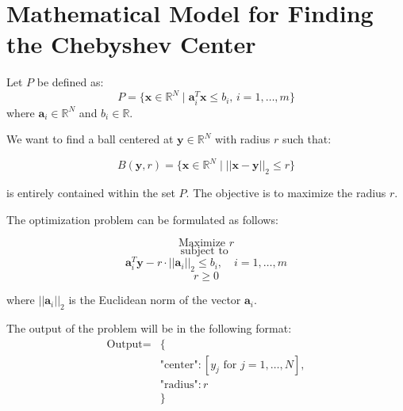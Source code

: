\documentclass{article}
\begin{document}
\section*{Mathematical Model for Finding the Chebyshev Center}

Let \( P \) be defined as:
\[
P = \{ \mathbf{x} \in \mathbb{R}^N \mid \mathbf{a}_i^T \mathbf{x} \leq b_i, \, i = 1, \ldots, m \}
\]
where \( \mathbf{a}_i \in \mathbb{R}^N \) and \( b_i \in \mathbb{R} \).

We want to find a ball centered at \( \mathbf{y} \in \mathbb{R}^N \) with radius \( r \) such that:

\[
B(\mathbf{y}, r) = \{ \mathbf{x} \in \mathbb{R}^N \mid ||\mathbf{x} - \mathbf{y}||_2 \leq r \}
\]

is entirely contained within the set \( P \). The objective is to maximize the radius \( r \).

The optimization problem can be formulated as follows:

\[
\text{Maximize } r
\]
\[
\text{subject to }
\]
\[
\mathbf{a}_i^T \mathbf{y} - r \cdot ||\mathbf{a}_i||_2 \leq b_i, \quad i = 1, \ldots, m
\]
\[
r \geq 0
\]

where \( ||\mathbf{a}_i||_2 \) is the Euclidean norm of the vector \( \mathbf{a}_i \).

The output of the problem will be in the following format:
\[
\begin{aligned}
\text{Output} = & \{ \\
& \text{"center"}: [y_j \text{ for } j = 1, \ldots, N], \\
& \text{"radius"}: r \\
& \}
\end{aligned}
\]
\end{document}
